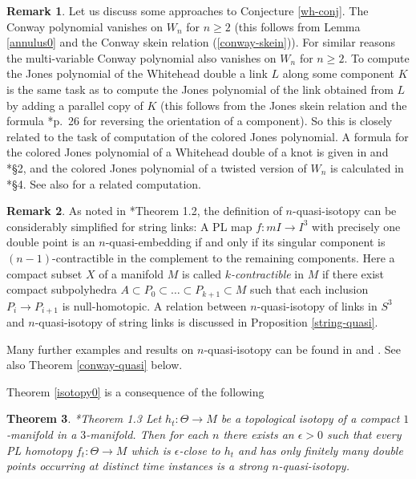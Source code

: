 \documentclass[a4paper,12pt,reqno,oneside]{amsart} %
\theoremstyle{plain}
\newtheorem{theorem}{Theorem}[section]
\theoremstyle{definition}
\newtheorem{remark}[theorem]{Remark}
\theoremstyle{named}
\renewcommand{\:}{\colon}
\begin{document}
\begin{remark}
Let us discuss some approaches to Conjecture \ref{wh-conj}.
The Conway polynomial vanishes on $W_n$ for $n\ge 2$ (this follows from Lemma \ref{annulus0} and the Conway skein relation (\ref{conway-skein})).
For similar reasons the multi-variable Conway polynomial also vanishes on $W_n$ for $n\ge 2$.
To compute the Jones polynomial of the Whitehead double a link $L$ along some component $K$ is the same task as to compute the Jones polynomial 
of the link obtained from $L$ by adding a parallel copy of $K$ (this follows from the Jones skein relation and the formula \cite{Lic}*{p.\ 26} 
for reversing the orientation of a component).
So this is closely related to the task of computation of the colored Jones polynomial.
A formula for the colored Jones polynomial of a Whitehead double of a knot is given in \cite{Tan} and \cite{Zh}*{\S2}, and 
the colored Jones polynomial of a twisted version of $W_n$ is calculated in \cite{Wo}*{\S4}.
See also \cite{Fu0} for a related computation.
\end{remark}

\begin{remark} As noted in \cite{MR2}*{Theorem 1.2}, the definition of $n$-quasi-isotopy can be considerably simplified for string links:
A PL map $f\:mI\to I^3$ with precisely one double point is an $n$-quasi-embedding if and only if its singular component is 
$(n-1)$-contractible in the complement to the remaining components. 
Here a compact subset $X$ of a manifold $M$ is called {\it $k$-contractible} in $M$ if there exist compact subpolyhedra
$A\subset P_0\subset\dots\subset P_{k+1}\subset M$ such that each inclusion $P_i\to P_{i+1}$ is null-homotopic.
A relation between $n$-quasi-isotopy of links in $S^3$ and $n$-quasi-isotopy of string links is discussed in Proposition \ref{string-quasi}.
\end{remark}

Many further examples and results on $n$-quasi-isotopy can be found in \cite{MR1} and \cite{MR2}.
See also Theorem \ref{conway-quasi} below.

Theorem \ref{isotopy0} is a consequence of the following

\begin{theorem} \cite{MR1}*{Theorem 1.3} \label{isotopy}
Let $h_t\:\Theta\to M$ be a topological isotopy of a compact $1$-manifold in a $3$-manifold.
Then for each $n$ there exists an $\epsilon>0$ such that every PL homotopy $f_t\:\Theta\to M$
which is $\epsilon$-close to $h_t$ and has only finitely many double points occurring at distinct time instances
is a strong $n$-quasi-isotopy.
\end{theorem}
\end{document}
